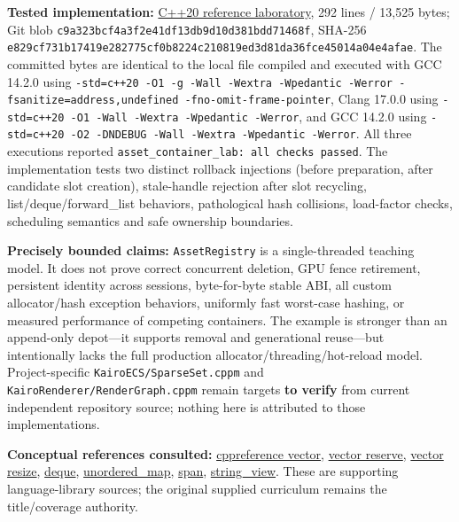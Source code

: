 \textbf{Tested implementation:} \href{tools/labs/asset_container_lab.cpp}{C++20 reference laboratory}, 292 lines / 13,525 bytes; Git blob \texttt{c9a323bcf4a3f2e41df13db9d10d381bdd71468f}, SHA-256 \texttt{e829cf731b17419e282775cf0b8224c210819ed3d81da36fce45014a04e4afae}. The committed bytes are identical to the local file compiled and executed with GCC 14.2.0 using \texttt{-std=c++20\ -O1\ -g\ -Wall\ -Wextra\ -Wpedantic\ -Werror\ -fsanitize=address,undefined\ -fno-omit-frame-pointer}, Clang 17.0.0 using \texttt{-std=c++20\ -O1\ -Wall\ -Wextra\ -Wpedantic\ -Werror}, and GCC 14.2.0 using \texttt{-std=c++20\ -O2\ -DNDEBUG\ -Wall\ -Wextra\ -Wpedantic\ -Werror}. All three executions reported \texttt{asset\_container\_lab:\ all\ checks\ passed}. The implementation tests two distinct rollback injections (before preparation, after candidate slot creation), stale-handle rejection after slot recycling, list/deque/forward\_list behaviors, pathological hash collisions, load-factor checks, scheduling semantics and safe ownership boundaries.

\textbf{Precisely bounded claims:} \texttt{AssetRegistry} is a single-threaded teaching model. It does not prove correct concurrent deletion, GPU fence retirement, persistent identity across sessions, byte-for-byte stable ABI, all custom allocator/hash exception behaviors, uniformly fast worst-case hashing, or measured performance of competing containers. The example is stronger than an append-only depot---it supports removal and generational reuse---but intentionally lacks the full production allocator/threading/hot-reload model. Project-specific \texttt{KairoECS/SparseSet.cppm} and \texttt{KairoRenderer/RenderGraph.cppm} remain targets \textbf{to verify} from current independent repository source; nothing here is attributed to those implementations.

\textbf{Conceptual references consulted:} \href{https://en.cppreference.com/w/cpp/container/vector}{cppreference vector}, \href{https://en.cppreference.com/cpp/container/vector/reserve}{vector reserve}, \href{https://en.cppreference.com/cpp/container/vector/resize}{vector resize}, \href{https://en.cppreference.com/w/cpp/container/deque}{deque}, \href{https://en.cppreference.com/cpp/container/unordered_map}{unordered\_map}, \href{https://en.cppreference.com/w/cpp/container/span}{span}, \href{https://en.cppreference.com/w/cpp/string/basic_string_view}{string\_view}. These are supporting language-library sources; the original supplied curriculum remains the title/coverage authority.

